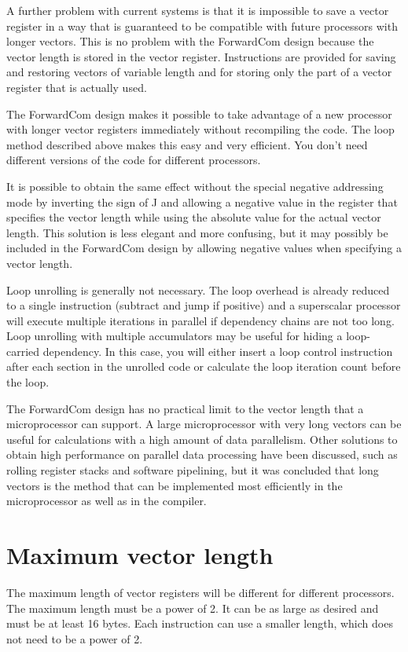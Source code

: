 \documentclass[forwardcom.tex]{subfiles}
\begin{document}
A further problem with current systems is that it is impossible to save a vector register in a way that is guaranteed to be compatible with future processors with longer vectors. This is no problem with the ForwardCom design because the vector length is stored in the vector register. Instructions are provided for saving and restoring vectors of variable length and for storing only the part of a vector register that is actually used.
\vspace{2mm}

The ForwardCom design makes it possible to take advantage of a new processor with longer vector registers immediately without recompiling the code. The loop method described above makes this easy and very efficient. You don't need different versions of the code for different processors.
\vspace{2mm}

It is possible to obtain the same effect without the special negative addressing mode by inverting the sign of J and allowing a negative value in the register that specifies the vector length while using the absolute value for the actual vector length. This solution is less elegant and more confusing, but it may possibly be included in the ForwardCom design by allowing negative values when specifying a vector length.
\vspace{2mm}

Loop unrolling is generally not necessary. The loop overhead is already reduced to a single instruction (subtract and jump if positive) and a superscalar processor will execute multiple iterations in parallel if dependency chains are not too long. Loop unrolling with multiple accumulators may be useful for hiding a loop-carried dependency. In this case, you will either insert a loop control instruction after each section in the unrolled code or calculate the loop iteration count before the loop.
\vspace{2mm}

The ForwardCom design has no practical limit to the vector length that a microprocessor can support. A large microprocessor with very long vectors can be useful for calculations with a high amount of data parallelism. Other solutions to obtain high performance on parallel data processing have been discussed, such as rolling register stacks and software pipelining, but it was concluded that long vectors is the method that can be implemented most efficiently in the microprocessor as well as in the compiler.

\section{Maximum vector length}
The maximum length of vector registers will be different for different processors. The maximum length must be a power of 2. It can be as large as desired and must be at least 16 bytes. Each instruction can use a smaller length, which does not need to be a power of 2.
\vspace{2mm}
\end{document}
